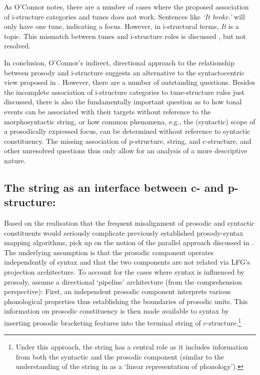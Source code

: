 \documentclass[output=paper,hidelinks]{langscibook}
\begin{document}
\noindent As O'Connor notes, there are a number of cases where the proposed association of i-structure categories and tunes does not work. Sentences like {\em `It broke.'} will only have one tune, indicating a {\sc focus}. However, in i-structural terms, {\em It} is a {\sc topic}. This mismatch between tunes and i-structure roles is discussed \citep[161]{Oconnor2005}, but not resolved.

In conclusion, O'Connor's indirect, directional approach to the relationship between prosody and i-structure suggests an alternative to the syntactocentric view proposed in \citet{buttking98}.  However, there are a number of outstanding questions. Besides the incomplete association of i-structure categories to tune-structure rules  just discussed, there is also the fundamentally important question as to how tonal events can be associated with their targets without reference to the morphosyntactic string, or how common phenomena, e.g., the (syntactic) scope of a prosodically expressed focus, can be determined without reference to syntactic constituency. The missing association of p-structure, string, and c-structure, and other unresolved questions thus only allow for an analysis of a more descriptive nature.

\subsection{The string as an interface between c- and p-structure: \citet{boegeletal09,boegel-etal2010}}
\label{subsec:Boegeletal}
Based on the realisation  that the frequent misalignment of prosodic and syntactic constituents would seriously complicate previously established prosody-syntax mapping algorithms, \citet{boegeletal09} pick up on the notion of the parallel approach discussed in . The underlying assumption is that the prosodic component operates independently of syntax and that the two components are not related via LFG's projection architecture. To account for the cases where syntax is influenced by prosody, \citet{boegeletal09} assume  a directional `pipeline' architecture (from the comprehension perspective): First, an independent prosodic component interprets various phonological properties thus establishing the boundaries of prosodic units.  This information on prosodic constituency is then made available to syntax by inserting prosodic  bracketing features into the terminal string of c-structure.\footnote{Under this approach, the string has a central role as it includes information from both the syntactic and the prosodic component (similar to the understanding of the string in \citealt[110]{Asudeh2009} as a `linear representation of phonology').}  
\end{document}
